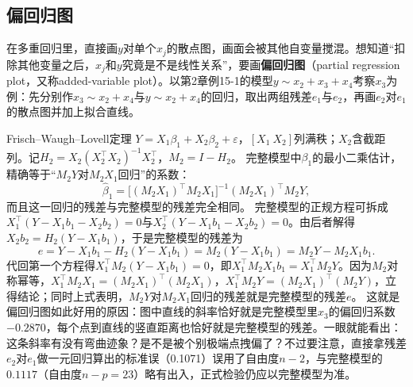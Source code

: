 \subsection{偏回归图}
在多重回归里，直接画$y$对单个$x_j$的散点图，画面会被其他自变量搅混。想知道“扣除其他变量之后，$x_j$和$y$究竟是不是线性关系”，要画\textbf{偏回归图}（partial regression plot，又称added-variable plot）。以第2章例15-1的模型$y\sim x_2+x_3+x_4$考察$x_3$为例：先分别作$x_3\sim x_2+x_4$与$y\sim x_2+x_4$的回归，取出两组残差$e_1$与$e_2$，再画$e_2$对$e_1$的散点图并加上拟合直线。
\begin{center}
\end{center}
\begin{derivation}{Frisch--Waugh--Lovell定理}
$Y=X_1\beta_1+X_2\beta_2+\varepsilon$，$[X_1\ X_2]$列满秩；$X_2$含截距列。记$H_2=X_2(X_2^\top X_2)^{-1}X_2^\top$，$M_2=I-H_2$。
完整模型中$\beta_1$的最小二乘估计，精确等于“$M_2Y$对$M_2X_1$回归”的系数：
\[
\widehat\beta_1=\bigl[(M_2X_1)^\top M_2X_1\bigr]^{-1}(M_2X_1)^\top M_2Y ,
\]
而且这一回归的残差与完整模型的残差完全相同。
完整模型的正规方程可拆成$X_1^\top(Y-X_1b_1-X_2b_2)=0$与$X_2^\top(Y-X_1b_1-X_2b_2)=0$。由后者解得$X_2b_2=H_2(Y-X_1b_1)$，于是完整模型的残差为
\[
e=Y-X_1b_1-H_2(Y-X_1b_1)=M_2(Y-X_1b_1)=M_2Y-M_2X_1b_1 .
\]
代回第一个方程得$X_1^\top M_2(Y-X_1b_1)=0$，即$X_1^\top M_2X_1b_1=X_1^\top M_2Y$。因为$M_2$对称幂等，$X_1^\top M_2X_1=(M_2X_1)^\top(M_2X_1)$，$X_1^\top M_2Y=(M_2X_1)^\top(M_2Y)$，立得结论；同时上式表明，$M_2Y$对$M_2X_1$回归的残差就是完整模型的残差$e$。
这就是偏回归图如此好用的原因：图中直线的斜率恰好就是完整模型里$x_3$的偏回归系数$-0.2870$，每个点到直线的竖直距离也恰好就是完整模型的残差。一眼就能看出：这条斜率有没有弯曲迹象？是不是被个别极端点拽偏了？不过要注意，直接拿残差$e_2$对$e_1$做一元回归算出的标准误（0.1071）误用了自由度$n-2$，与完整模型的$0.1117$（自由度$n-p=23$）略有出入，正式检验仍应以完整模型为准。
\end{derivation}
